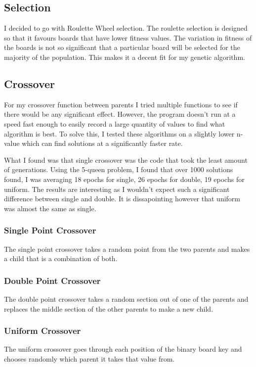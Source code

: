 \documentclass[a4paper,11pt]{article}
\begin{document}
\subsection*{Selection}
I decided to go with Roulette Wheel selection. The roulette selection is designed so that it favours boards that have lower fitness values. The variation in fitness of the boards is not so significant that a particular board will be selected for the majority of the population. This makes it a decent fit for my genetic algorithm.

\subsection*{Crossover}
For my crossover function between parents I tried multiple functions to see if there would be any significant effect.
However, the program doesn't run at a speed fast enough to easily record a large quantity of values to find what algorithm is best.
To solve this, I tested these algorithms on a slightly lower n-value which can find solutions at a significantly faster rate.

What I found was that single crossover was the code that took the least amount of generations. Using the 5-queen problem, I found that over 1000 solutions found, I was averaging 18 epochs for single, 26 epochs for double, 19 epochs for uniform. The results are interesting as I wouldn't expect such a significant difference between single and double. It is dissapointing however that uniform was almost the same as single.

\subsubsection*{Single Point Crossover}
The single point crossover takes a random point from the two parents and makes a child that is a combination of both.


\subsubsection*{Double Point Crossover}
The double point crossover takes a random section out of one of the parents and replaces the middle section of the other parents to make a new child.


\subsubsection*{Uniform Crossover}
The uniform crossover goes through each position of the binary board key and chooses randomly which parent it takes that value from.
\end{document}

